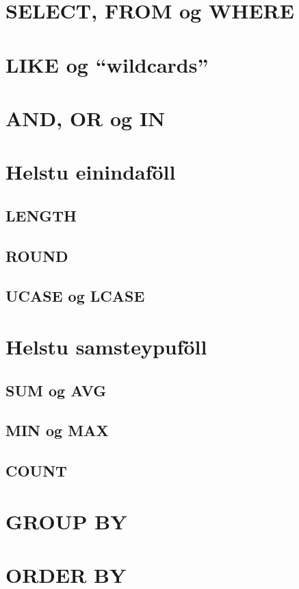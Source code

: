 \section{SELECT, FROM og WHERE}
\section{LIKE og ``wildcards''}
\section{AND, OR og IN}
\section{Helstu einindaföll}
\subsection{LENGTH}
\subsection{ROUND}
\subsection{UCASE og LCASE}
\section{Helstu samsteypuföll}
\subsection{SUM og AVG}
\subsection{MIN og MAX}
\subsection{COUNT}
\section{GROUP BY}
\section{ORDER BY}